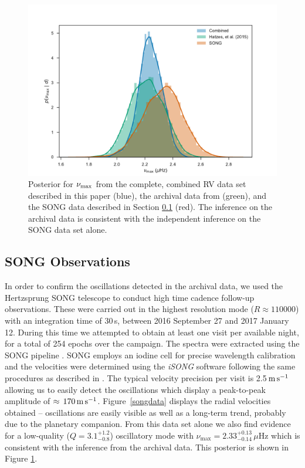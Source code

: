 \documentclass[modern]{aastex61}
\newcommand{\numax}{\mbox{$\nu_{\rm max}$}\xspace}
\newcommand{\twosidedrange}[3]{\ensuremath{#1^{+#2}_{-#3}}}
\newcommand{\SONGQRange}{\twosidedrange{3.1}{1.2}{0.8}}
\newcommand{\SONGNuMaxRange}{\twosidedrange{2.33}{0.13}{0.14}}
\begin{document}
\begin{figure}
  \includegraphics[width=\columnwidth]{../plots/numax}
  \caption{Posterior for \numax{} from the complete, combined RV data set described in this paper (blue), the archival data from \citet{Hatzes2015} (green), and the SONG data described in Section \ref{sec:SONG-observations} (red).  The inference on the archival data is consistent with the independent inference on the SONG data set alone.}
  \label{fig:numax-datasets}
\end{figure}

\subsection{SONG Observations}    %
\label{sec:SONG-observations} In order to confirm the oscillations detected in
the archival data, we used the Hertzsprung SONG telescope
\citep{2017ApJ...836..142G} to conduct high time cadence follow-up observations.
These were carried out in the highest resolution mode ($R\approx110000$) with an
integration time of 30\,s, between 2016 September 27 and 2017 January 12. During
this time we attempted to obtain at least one visit per available night, for a
total of 254 epochs over the campaign. The spectra were extracted using the SONG
pipeline \citep[see][]{2017ApJ...836..142G}. SONG employs an iodine cell for
precise wavelength calibration and the velocities were determined using the
\textit{iSONG} software following the same procedures as described in
\cite{2017ApJ...836..142G}. The typical velocity precision per visit is
2.5$\,\rm m\,s^{-1}$ allowing us to easily detect the oscillations which
display a peak-to-peak amplitude of $\approx \, 170 \, \rm m \, s^{-1}$.
Figure~\ref{songdata} displays the radial velocities obtained -- oscillations
are easily visible as well as a long-term trend, probably due to the planetary
companion.  From this data set alone we also find evidence for a low-quality ($Q
= \SONGQRange{}$) oscillatory mode with $\nu_\mathrm{max} = \SONGNuMaxRange{} \,
\mu\mathrm{Hz}$ which is consistent with the inference from the archival data.
This posterior is shown in Figure \ref{fig:numax-datasets}.
\end{document}
